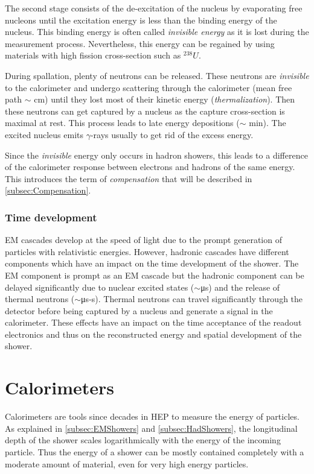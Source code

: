 The second stage consists of the de-excitation of the nucleus by evaporating free nucleons until the excitation energy is less than the binding energy of the nucleus. This binding energy is often called \textit{invisible energy} as it is lost during the measurement process. Nevertheless, this energy can be regained by using materials with high fission cross-section such as $^{238}U$.

During spallation, plenty of neutrons can be released. These neutrons are \textit{invisible} to the calorimeter and undergo scattering through the calorimeter (mean free path $\sim$ cm) until they lost most of their kinetic energy (\textit{thermalization}). Then these neutrons can get captured by a nucleus as the capture cross-section is maximal at rest. This process leads to late energy depositions ($\sim$ min). The excited nucleus emits $\gamma$-rays usually to get rid of the excess energy.

Since the \textit{invisible} energy only occurs in hadron showers, this leads to a difference of the calorimeter response between electrons and hadrons of the same energy. This introduces the term of \textit{compensation} that will be described in \ref{subsec:Compensation}.

\subsubsection{Time development}

EM cascades develop at the speed of light due to the prompt generation of particles with relativistic energies. However, hadronic cascades have different components which have an impact on the time development of the shower. The EM component is prompt as an EM cascade but the hadronic component can be delayed significantly due to nuclear excited states ($\sim$\si{\micro\second}) and the release of thermal neutrons ($\sim$\si{\micro\second}-\si{\second}). Thermal neutrons can travel significantly through the detector before being captured by a nucleus and generate a signal in the calorimeter. These effects have an impact on the time acceptance of the readout electronics and thus on the reconstructed energy and spatial development of the shower.

\section{Calorimeters}

Calorimeters are tools since decades in HEP to measure the energy of particles. As explained in \ref{subsec:EMShowers} and \ref{subsec:HadShowers}, the longitudinal depth of the shower scales logarithmically with the energy of the incoming particle. Thus the energy of a shower can be mostly contained completely with a moderate amount of material, even for very high energy particles.

